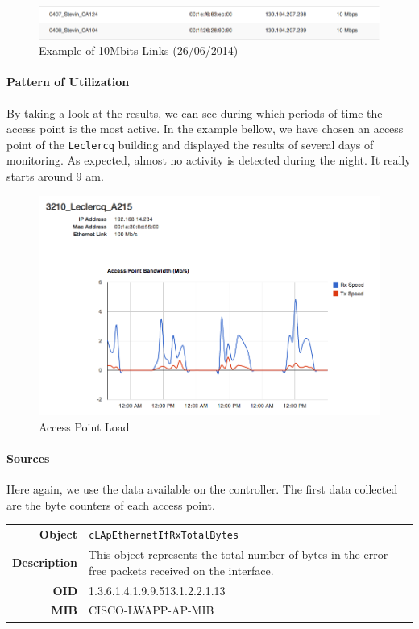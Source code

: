 \begin{figure}[H]
   \includegraphics[width=\textwidth]{Pictures/chapter5/slowLinks.png}
   \caption{Example of 10Mbits Links (26/06/2014)}
\end{figure}

\paragraph*{Pattern of Utilization} By taking a look at the results, we can see during which periods of time the access point is the most active. In the example bellow, we have chosen an access point of the \texttt{Leclercq} building and displayed the results of several days of monitoring. As expected, almost no activity is detected during the night. It really starts around 9 am. 

\begin{figure}[H]
   \includegraphics[width=\textwidth]{Pictures/chapter5/apLoad.png}
   \caption{Access Point Load}
\end{figure}

\paragraph*{Sources} Here again, we use the data available on the controller. The first data collected are the byte counters of each access point.

\begin{tabular}{|r l|}
\hline
\textbf{Object} & \texttt{cLApEthernetIfRxTotalBytes} \\
\textbf{Description} & \parbox{11cm}{This object represents the total number of bytes in the error-free packets received on the interface.} \\
\textbf{OID} & 1.3.6.1.4.1.9.9.513.1.2.2.1.13 \\
\textbf{MIB} & CISCO-LWAPP-AP-MIB \\
\hline
\end{tabular}

